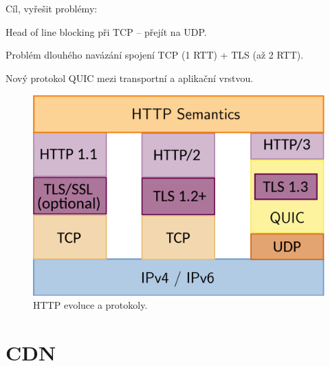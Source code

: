 \begin{compactitem}
    \item Cíl, vyřešit problémy: \begin{compactitem}
        \item Head of line blocking při TCP -- přejít na UDP.
        \item Problém dlouhého navázání spojení TCP (1 RTT) + TLS (až 2 RTT).
    \end{compactitem}
    \item Nový protokol QUIC mezi transportní a aplikační vrstvou.
    \begin{figure}[H]
        \centering
        \includegraphics[width=0.5\linewidth]{http_protocol_stacks.png}
        \caption{HTTP evoluce a protokoly.}
    \end{figure}
\end{compactitem}


\section{CDN}

